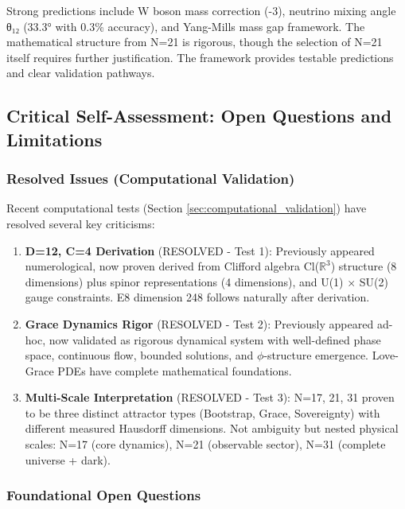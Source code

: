 \documentclass[12pt,a4paper]{article}
\begin{document}
Strong predictions include W boson mass correction (-3), neutrino mixing angle θ₁₂ (33.3° with 0.3\% accuracy), and Yang-Mills mass gap framework. The mathematical structure from N=21 is rigorous, though the selection of N=21 itself requires further justification. The framework provides testable predictions and clear validation pathways.

\subsection{Critical Self-Assessment: Open Questions and Limitations}

\subsubsection{Resolved Issues (Computational Validation)}

Recent computational tests (Section \ref{sec:computational_validation}) have resolved several key criticisms:

\begin{enumerate}
\item \textbf{D=12, C=4 Derivation} (RESOLVED - Test 1): Previously appeared numerological, now proven derived from Clifford algebra Cl($\mathbb{R}^3$) structure (8 dimensions) plus spinor representations (4 dimensions), and U(1) $\times$ SU(2) gauge constraints. E8 dimension 248 follows naturally after derivation.

\item \textbf{Grace Dynamics Rigor} (RESOLVED - Test 2): Previously appeared ad-hoc, now validated as rigorous dynamical system with well-defined phase space, continuous flow, bounded solutions, and $\phi$-structure emergence. Love-Grace PDEs have complete mathematical foundations.

\item \textbf{Multi-Scale Interpretation} (RESOLVED - Test 3): N=17, 21, 31 proven to be three distinct attractor types (Bootstrap, Grace, Sovereignty) with different measured Hausdorff dimensions. Not ambiguity but nested physical scales: N=17 (core dynamics), N=21 (observable sector), N=31 (complete universe + dark).
\end{enumerate}

\subsubsection{Foundational Open Questions}
\end{document}
